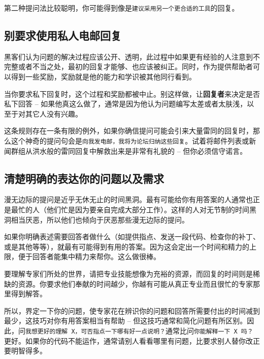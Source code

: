 \documentclass[titlepage]{article}
\begin{document}
第二种提问法比较聪明，你可能得到像是\texttt{建议采用另一个更合适的工具}的回复。

\hypertarget{ux522bux8981ux6c42ux4f7fux7528ux79c1ux4ebaux7535ux90aeux56deux590d}{\subsection{别要求使用私人电邮回复}\label{ux522bux8981ux6c42ux4f7fux7528ux79c1ux4ebaux7535ux90aeux56deux590d}}

黑客们认为问题的解决过程应该公开、透明，此过程中如果更有经验的人注意到不完整或者不当之处，最初的回复才能够、也应该被纠正。同时，作为提供帮助者可以得到一些奖励，奖励就是他的能力和学识被其他同行看到。

当你要求私下回复时，这个过程和奖励都被中止。别这样做，让\textbf{回复者}来决定是否私下回答
--
如果他真这么做了，通常是因为他认为问题编写太差或者太肤浅，以至于对其它人没有兴趣。

这条规则存在一条有限的例外，如果你确信提问可能会引来大量雷同的回复时，那么这个神奇的提问句会是\texttt{向我发电邮，我将为论坛归纳这些回复}。试着将邮件列表或新闻群组从洪水般的雷同回复中解救出来是非常有礼貌的
-- 但你必须信守诺言。

\hypertarget{ux6e05ux695aux660eux786eux7684ux8868ux8fbeux4f60ux7684ux95eeux9898ux4ee5ux53caux9700ux6c42}{\subsection{清楚明确的表达你的问题以及需求}\label{ux6e05ux695aux660eux786eux7684ux8868ux8fbeux4f60ux7684ux95eeux9898ux4ee5ux53caux9700ux6c42}}

漫无边际的提问是近乎无休无止的时间黑洞。最有可能给你有用答案的人通常也正是最忙的人（他们忙是因为要亲自完成大部分工作）。这样的人对无节制的时间黑洞相当厌恶，所以他们也倾向于厌恶那些漫无边际的提问。

如果你明确表述需要回答者做什么（如提供指点、发送一段代码、检查你的补丁、或是其他等等），就最有可能得到有用的答案。因为这会定出一个时间和精力的上限，便于回答者能集中精力来帮你。这么做很棒。

要理解专家们所处的世界，请把专业技能想像为充裕的资源，而回复的时间则是稀缺的资源。你要求他们奉献的时间越少，你越有可能从真正专业而且很忙的专家那里得到解答。

所以，界定一下你的问题，使专家花在辨识你的问题和回答所需要付出的时间减到最少，这技巧对你有用答案相当有帮助
--
但这技巧通常和简化问题有所区别。因此，问\texttt{我想更好的理解\ X，可否指点一下哪有好一点说明？}通常比问\texttt{你能解释一下\ X\ 吗？}更好。如果你的代码不能运作，通常请别人看看哪里有问题，比要求别人替你改正要明智得多。
\end{document}
